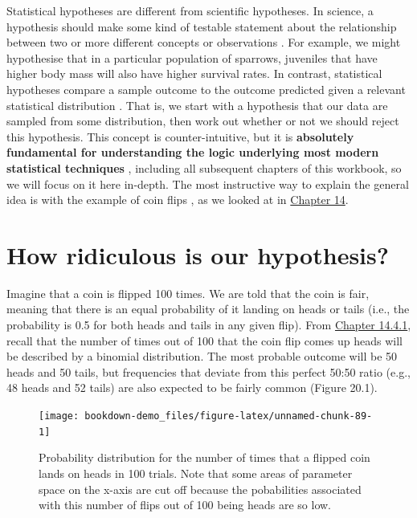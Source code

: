 \documentclass[
]{scrbook}
\begin{document}
Statistical hypotheses are different from scientific hypotheses.
In science, a hypothesis should make some kind of testable statement about the relationship between two or more different concepts or observations \citep{Bouma2000}.
For example, we might hypothesise that in a particular population of sparrows, juveniles that have higher body mass will also have higher survival rates.
In contrast, statistical hypotheses compare a sample outcome to the outcome predicted given a relevant statistical distribution \citep{Sokal1995}.
That is, we start with a hypothesis that our data are sampled from some distribution, then work out whether or not we should reject this hypothesis.
This concept is counter-intuitive, but it is \textbf{absolutely fundamental for understanding the logic underlying most modern statistical techniques} \citep{Sokal1995, Mayo1996, Greenland2016}, including all subsequent chapters of this workbook, so we will focus on it here in-depth.
The most instructive way to explain the general idea is with the example of coin flips \citep{Mayo1996}, as we looked at in \protect\hyperlink{Chapter_14}{Chapter 14}.

\hypertarget{how-ridiculous-is-our-hypothesis}{%
\section{How ridiculous is our hypothesis?}\label{how-ridiculous-is-our-hypothesis}}

Imagine that a coin is flipped 100 times.
We are told that the coin is fair, meaning that there is an equal probability of it landing on heads or tails (i.e., the probability is 0.5 for both heads and tails in any given flip).
From \protect\hyperlink{Chapter_14.htmlux5cux23binomial-distribution}{Chapter 14.4.1}, recall that the number of times out of 100 that the coin flip comes up heads will be described by a binomial distribution.
The most probable outcome will be 50 heads and 50 tails, but frequencies that deviate from this perfect 50:50 ratio (e.g., 48 heads and 52 tails) are also expected to be fairly common (Figure 20.1).

\begin{figure}
\texttt{[image: bookdown-demo\_files/figure-latex/unnamed-chunk-89-1]} \caption{Probability distribution for the number of times that a flipped coin lands on heads in 100 trials. Note that some areas of parameter space on the x-axis are cut off because the pobabilities associated with this number of flips out of 100 being heads are so low.}\label{fig:unnamed-chunk-89}
\end{figure}
\end{document}
